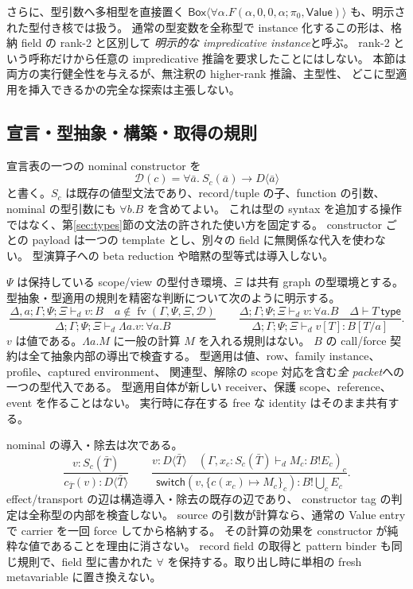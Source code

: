 \documentclass[11pt,a4paper]{article}
\newcommand{\fv}{\operatorname{fv}}
\newcommand{\D}{\mathcal D}
\begin{document}
さらに、型引数へ多相型を直接置く
\(\mathsf{Box}\langle\forall\alpha.F(\alpha,0,0,\alpha;\pi_0,\mathsf{Value})\rangle\)
も、明示された型付き核では扱う。
通常の型変数を全称型で instance 化するこの形は、格納 field の rank-2 と区別して
\emph{明示的な impredicative instance}と呼ぶ。
rank-2 という呼称だけから任意の impredicative 推論を要求したことにはしない。
本節は両方の実行健全性を与えるが、無注釈の higher-rank 推論、主型性、
どこに型適用を挿入できるかの完全な探索は主張しない。

\subsection{宣言・型抽象・構築・取得の規則}

宣言表の一つの nominal constructor を
\[
 \D(c)=\forall\bar a.\ S_c(\bar a)\longrightarrow D\langle\bar a\rangle
\]
と書く。\(S_c\) は既存の値型文法であり、record/tuple の子、function の引数、
nominal の型引数にも \(\forall b.B\) を含めてよい。
これは型の syntax を追加する操作ではなく、第\ref{sec:types}節の文法の許された使い方を固定する。
constructor ごとの payload は一つの template とし、別々の field に無関係な代入を使わない。
型演算子への beta reduction や暗黙の型等式は導入しない。

\(\Psi\) は保持している scope/view の型付き環境、\(\Xi\) は共有 graph の型環境とする。
型抽象・型適用の規則を精密な判断について次のように明示する。
\[
 \frac{\Delta,a;\Gamma;\Psi;\Xi\vdash_d v:B
       \quad a\notin\fv(\Gamma,\Psi,\Xi,\D)}
      {\Delta;\Gamma;\Psi;\Xi\vdash_d\Lambda a.v:\forall a.B}
 \qquad
 \frac{\Delta;\Gamma;\Psi;\Xi\vdash_d v:\forall a.B\quad\Delta\vdash T\ \mathsf{type}}
      {\Delta;\Gamma;\Psi;\Xi\vdash_d v[T]:B[T/a]}.
\]
\(v\) は値である。\(\Lambda a.M\) に一般の計算 \(M\) を入れる規則はない。
\(B\) の call/force 契約は全て抽象内部の導出で検査する。
型適用は値、row、family instance、profile、captured environment、
関連型、解除の scope 対応を含む\emph{全 packet}への一つの型代入である。
型適用自体が新しい receiver、保護 scope、reference、event を作ることはない。
実行時に存在する free な identity はそのまま共有する。

nominal の導入・除去は次である。
\[
 \frac{v:S_c(\bar T)}{c_{\bar T}(v):D\langle\bar T\rangle}
 \qquad
 \frac{v:D\langle\bar T\rangle\quad
        (\Gamma,x_c:S_c(\bar T)\vdash_d M_c:B!E_c)_c}
      {\mathsf{switch}(v,\{c(x_c)\mapsto M_c\}_c):B!\bigcup_c E_c}.
\]
effect/transport の辺は構造導入・除去の既存の辺であり、
constructor tag の判定は全称型の内部を検査しない。
source の引数が計算なら、通常の Value entry で carrier を一回 force してから格納する。
その計算の効果を constructor が純粋な値であることを理由に消さない。
record field の取得と pattern binder も同じ規則で、field 型に書かれた
\(\forall\) を保持する。取り出し時に単相の fresh metavariable に置き換えない。
\end{document}
